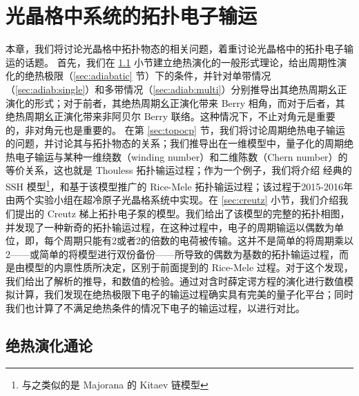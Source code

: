 \chapter{光晶格中系统的拓扑电子输运} \label{chap:chargepump}

本章，我们将讨论光晶格中拓扑物态的相关问题，着重讨论光晶格中的拓扑电子输运的话题。
首先，我们在 \ref{sec:adiabevolgeneral} 小节建立绝热演化的一般形式理论，给出周期性演化的绝热极限（\ref{sec:adiabatic} 节）下的条件，并针对单带情况（\ref{sec:adiab:single}）和多带情况（\ref{sec:adiab:multi}）分别推导出其绝热周期幺正演化的形式；对于前者，其绝热周期幺正演化带来 Berry 相角，而对于后者，其绝热周期幺正演化带来非阿贝尔 Berry 联络。这种情况下，不止对角元是重要的，非对角元也是重要的。
在第 \ref{sec:topocp} 节，我们将讨论周期绝热电子输运的问题，并讨论其与拓扑物态的关系；我们推导出在一维模型中，量子化的周期绝热电子输运与某种一维绕数（winding number）和二维陈数（Chern number）的等价关系，这也就是 Thouless 拓扑输运过程\cite{thouless1983}；作为一个例子，我们将介绍 经典的 SSH 模型\cite{ssh1979}\footnote{与之类似的是 Majorana 的 Kitaev 链模型\cite{kitaev2001}}，和基于该模型推广的 Rice-Mele 拓扑输运过程\cite{ricemele1982}；该过程于2015-2016年由两个实验小组在超冷原子光晶格系统中实现。在 \ref{sec:creutz} 小节，我们介绍我们提出的 Creutz 梯\cite{creutz1999}上拓扑电子泵的模型\cite{creutz}。我们给出了该模型的完整的拓扑相图，并发现了一种新奇的拓扑输运过程，在这种过程中，电子的周期输运以偶数为单位，即，每个周期只能有2或者2的倍数的电荷被传输。这并不是简单的将周期乘以2——或简单的将模型进行双份备份——所导致的偶数为基数的拓扑输运过程，而是由模型的内禀性质所决定，区别于前面提到的 Rice-Mele 过程。对于这个发现，我们给出了解析的推导，和数值的检验。通过对含时薛定谔方程的演化进行数值模拟计算，我们发现在绝热极限下电子的输运过程确实具有完美的量子化平台；同时我们也计算了不满足绝热条件的情况下电子的输运过程，以进行对比。





\section{绝热演化通论}\label{sec:adiabevolgeneral}

